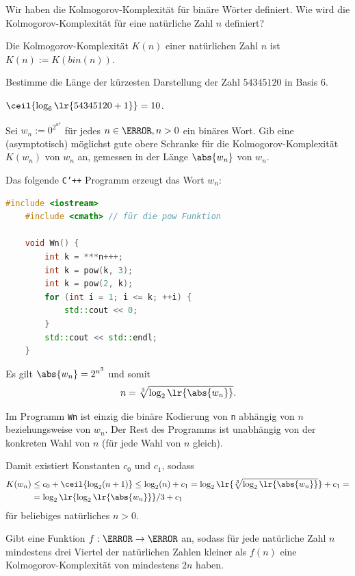 \begin{questions}
	\question[2] Wir haben die Kolmogorov-Komplexität für binäre Wörter definiert. Wie wird die Kolmogorov-Komplexität für eine natürliche Zahl $n$ definiert?
	\begin{solution}
	Die Kolmogorov-Komplexität $K(n)$ einer natürlichen Zahl $n$ ist $K(n) := K(bin(n))$.
	\end{solution}


	\question[2] Bestimme die Länge der kürzesten Darstellung der Zahl $54345120$ in Basis $6$.
	\begin{solution}
		$\ceil{\log_6\lr{54345120 + 1}} = 10$.
	\end{solution}

	\question[2] Sei $w_n := 0^{2^{n^3}}$ für jedes $n\in\N, n>0$ ein binäres Wort.	Gib eine (asymptotisch) möglichst gute obere Schranke für die Kolmogorov-Komplexität $K(w_n)$ von $w_n$ an, gemessen in der Länge $\abs{w_n}$ von $w_n$.
	\begin{solution}
		Das folgende \texttt{C'++} Programm erzeugt das Wort $w_n$:
		\begin{lstlisting}[language=C++,caption=$W_n$]
    #include <iostream>
    #include <cmath> // für die pow Funktion
    
    void Wn() {
        int k = ***n+++;
        int k = pow(k, 3);
        int k = pow(2, k);
        for (int i = 1; i <= k; ++i) {
            std::cout << 0;
        }
        std::cout << std::endl;
    }
\end{lstlisting}
		Es gilt $\abs{w_n} = 2^{n^3}$ und somit
		\begin{align*}
			n = \sqrt[3]{\log_2\lr{\abs{w_n}}}.
		\end{align*}

		Im Programm \texttt{Wn} ist einzig die binäre Kodierung von \texttt{n} abhängig von $n$ beziehungsweise von $w_n$. Der Rest des Programms ist unabhängig von der konkreten Wahl von $n$ (für jede Wahl von $n$ gleich).

		Damit existiert Konstanten $c_0$ und $c_1$, sodass
\begin{align*}
	K(w_n) &\leq c_0 + \ceil{\log_2(n+1)} \leq \log_2(n) + c_1 = \log_2\lr{\sqrt[3]{\log_2\lr{\abs{w_n}}}} + c_1 = \\
	&=\log_2\lr{\log_2\lr{\abs{w_n}}} / 3 + c_1
\end{align*}
für beliebiges natürliches $n>0$.
	\end{solution}

	\question[2] Gibt eine Funktion $f: \N\to\N$ an, sodass für jede natürliche Zahl $n$ mindestens drei Viertel der natürlichen Zahlen kleiner als $f(n)$ eine Kolmogorov-Komplexität von mindestens $2n$ haben.


\end{questions}
